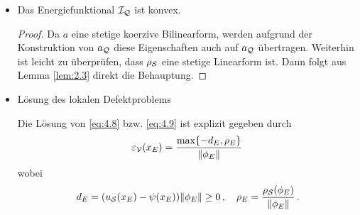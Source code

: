 \begin{itemize}
\item
\begin{lemma}
Das Energiefunktional $\mathcal I_{\mathcal Q}$ ist konvex.
\end{lemma}

\begin{proof}
Da $a$ eine stetige koerzive Bilinearform, werden aufgrund der Konstruktion von $a_{\mathcal Q}$ diese Eigenschaften auch auf $a_{\mathcal Q}$ übertragen. Weiterhin ist leicht zu überprüfen, dass $\rho_{\mathcal S}$ eine stetige Linearform ist. Dann folgt aus Lemma \ref{lem:2.3} direkt die Behauptung.
\end{proof}

\item Lösung des lokalen Defektproblems
\begin{satz}
Die Lösung von \eqref{eq:4.8} bzw. \eqref{eq:4.9} ist explizit gegeben durch
\begin{align}\label{eq:4.10}
	\varepsilon_{\mathcal V} (x_E) = \frac{\max \{-d_E,\rho_E\}}{\lVert \phi_E\rVert} \, 
\end{align}
wobei
\begin{align}\label{eq:4.11}
	d_E = (u_{\mathcal S}(x_E) - \psi (x_E))\lVert \phi_E\rVert \ge 0 \, , \quad \rho_E = \frac{\rho_{\mathcal S}(\phi_E)}{\lVert \phi_E\rVert} \, .
\end{align}
\end{satz}


\end{itemize}
